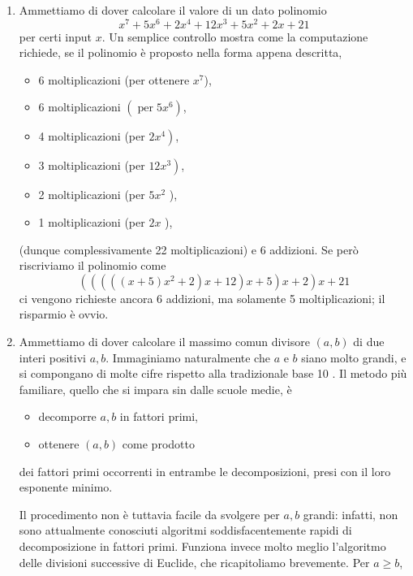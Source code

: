 \begin{enumerate}
    \item Ammettiamo di dover
          calcolare il valore di un dato polinomio
          $$
              x^7+5 x^6+2 x^4+12 x^3+5 x^2+2 x+21
          $$
          per certi input $x$. Un semplice controllo mostra come la computazione
          richiede, se il polinomio è proposto nella forma appena descritta,
          \begin{itemize}
              \item 6 moltiplicazioni (per ottenere $x^7$),
              \item 6 moltiplicazioni $\left(\operatorname{per} 5 x^6\right)$,
              \item 4 moltiplicazioni (per $\left.2 x^4\right)$,
              \item 3 moltiplicazioni (per $\left.12 x^3\right)$,
              \item 2 moltiplicazioni (per $5 x^2$ ),
              \item 1 moltiplicazioni (per $2 x$ ),
          \end{itemize}

          (dunque complessivamente 22 moltiplicazioni) e 6 addizioni. Se però
          riscriviamo il polinomio come
          $$
              \left(\left(\left(\left((x+5) x^2+2\right) x+12\right) x+5\right) x+2\right) x+21
          $$
          ci vengono richieste ancora 6 addizioni, ma solamente 5
          moltiplicazioni; il risparmio è ovvio.
    \item Ammettiamo di dover
          calcolare il massimo comun divisore $(a, b)$ di due interi positivi
          $a, b$. Immaginiamo naturalmente che $a$ e $b$ siano molto grandi, e
          si compongano di molte cifre rispetto alla tradizionale base 10 . Il
          metodo più familiare, quello che si impara sin dalle scuole medie, è
          \begin{itemize}

              \item decomporre $a, b$ in fattori primi,
              \item ottenere $(a, b)$ come prodotto

          \end{itemize}
          dei fattori primi occorrenti in entrambe le decomposizioni, presi con
          il loro esponente minimo.

          Il procedimento non è tuttavia facile da svolgere per $a, b$ grandi:
          infatti, non sono attualmente conosciuti algoritmi soddisfacentemente
          rapidi di decomposizione in fattori primi. Funziona invece molto
          meglio l'algoritmo delle divisioni successive di Euclide, che
          ricapitoliamo brevemente. Per $a \geq b$,


\end{enumerate}
